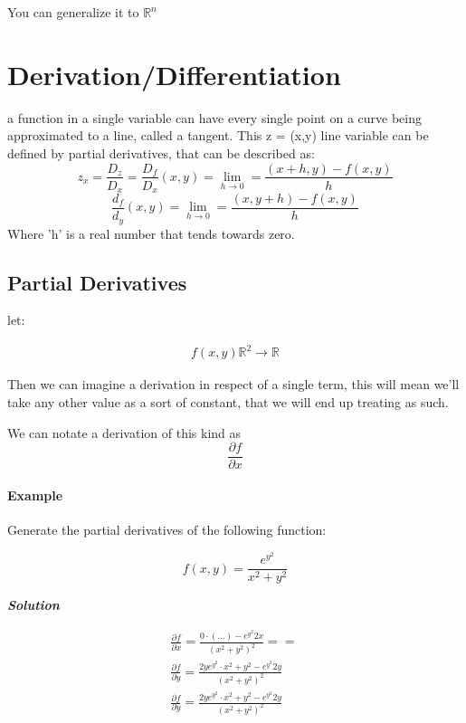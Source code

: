\documentclass[11pt,fleqn]{book} %
\begin{document}
You can generalize it to $\mathbb{R}^n$

\section{Derivation/Differentiation}

a function in a single variable can have every single point on a curve being approximated to
a line, called a tangent. This z = (x,y) line variable can be defined by partial derivatives, that
can be described as:
\begin{equation}
    z_x = \frac{D_z}{D_x} = \frac{D_f}{D_x} (x,y) = \lim_{h \to 0} = \frac{(x+h,y)-f(x,y)}{h} 
\end{equation}
\begin{equation}
    \frac{d_f}{d_y}(x,y) = \lim_{h \to 0} = \frac{(x,y+h)-f(x,y)}{h}
\end{equation}
Where 'h' is a real number that tends towards zero.

\subsection{Partial Derivatives}

let:

\begin{gather}
    f(x,y) \mathbb{R}^2 \to \mathbb{R}
\end{gather}

Then we can imagine a derivation in respect of a single term, this will mean we'll take any 
other value as a sort of constant, that we will end up treating as such.

We can notate a derivation of this kind as $$\frac{\partial f}{\partial x}$$

\paragraph{Example}

Generate the partial derivatives of the following function:

$$f(x,y) = \frac{e^{y^{2}}}{x^2+y^2}$$

\textit{\textbf{Solution}}

\begin{gather}
    \frac{\partial f}{\partial x} = \frac{0 \cdot (...) - e^y^2 2x}{(x^2+y^2)^2} == \frac{}{}\\
    \frac{\partial f}{\partial y} = \frac{2y e^{y^{2}} \cdot x^2+y^2 - e^{y^{2}} 2y }{(x^2+y^2)^2}\\
    \frac{\partial f}{\partial y} = \frac{2y e^{y^{2}} \cdot x^2+y^2 - e^{y^{2}} 2y }{(x^2+y^2)^2}\\
\end{gather}
\end{document}
